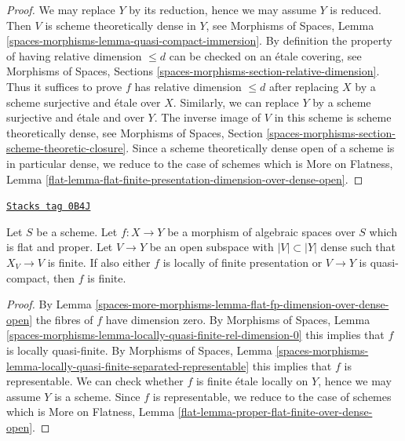 \begin{proof}
We may replace $Y$ by its reduction, hence we may assume $Y$ is reduced.
Then $V$ is scheme theoretically dense in $Y$, see
Morphisms of Spaces, Lemma
\ref{spaces-morphisms-lemma-quasi-compact-immersion}.
By definition the property of having relative dimension $\leq d$ can
be checked on an \'etale covering, see
Morphisms of Spaces, Sections \ref{spaces-morphisms-section-relative-dimension}.
Thus it suffices to prove $f$ has relative dimension $\leq d$
after replacing $X$ by a scheme surjective and \'etale over $X$.
Similarly, we can replace $Y$ by a scheme surjective and
\'etale and over $Y$. The inverse image of $V$ in this scheme is scheme
theoretically dense, see
Morphisms of Spaces, Section
\ref{spaces-morphisms-section-scheme-theoretic-closure}.
Since a scheme theoretically dense open of a scheme is in particular
dense, we reduce to the case of schemes which is
More on Flatness, Lemma
\ref{flat-lemma-flat-finite-presentation-dimension-over-dense-open}.
\end{proof}

\begin{lemma}
\label{spaces-more-morphisms-lemma-proper-flat-finite-over-dense-open}
\href{https://stacks.math.columbia.edu/tag/0B4J}{\texttt{Stacks tag 0B4J}}

Let $S$ be a scheme. Let $f : X \to Y$ be a morphism of algebraic spaces
over $S$ which is flat and proper. Let $V \to Y$ be an open subspace
with $|V| \subset |Y|$ dense such that $X_V \to V$ is finite. If also
either $f$ is locally of finite presentation or $V \to Y$ is quasi-compact,
then $f$ is finite.
\end{lemma}

\begin{proof}
By Lemma \ref{spaces-more-morphisms-lemma-flat-fp-dimension-over-dense-open}
the fibres of $f$ have dimension zero.
By Morphisms of Spaces, Lemma
\ref{spaces-morphisms-lemma-locally-quasi-finite-rel-dimension-0}
this implies that $f$ is locally quasi-finite.
By Morphisms of Spaces, Lemma
\ref{spaces-morphisms-lemma-locally-quasi-finite-separated-representable}
this implies that $f$ is representable.
We can check whether $f$ is finite \'etale locally on $Y$,
hence we may assume $Y$ is a scheme. Since  $f$ is representable,
we reduce to the case of schemes which is
More on Flatness, Lemma \ref{flat-lemma-proper-flat-finite-over-dense-open}.
\end{proof}

